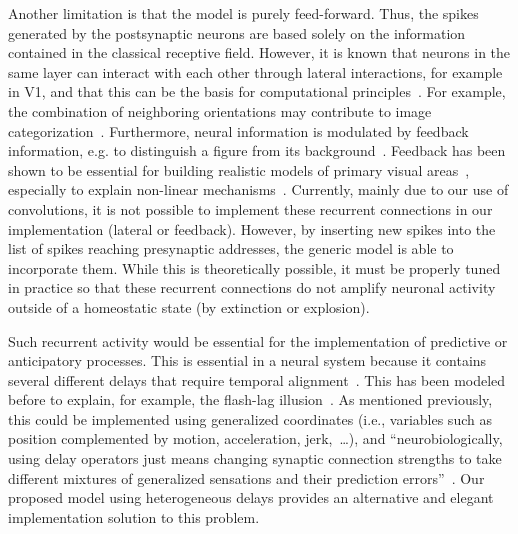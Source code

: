 \documentclass[default]{sn-jnl}%
\theoremstyle{thmstyleone}%
\theoremstyle{thmstyletwo}%
\theoremstyle{thmstylethree}%
\begin{document}
Another limitation is that the model is purely feed-forward. Thus, the spikes generated by the postsynaptic neurons are based solely on the information contained in the classical receptive field. However, it is known that neurons in the same layer can interact with each other through lateral interactions, for example in V1, and that this can be the basis for computational principles~\citep{chavane_revisiting_2022}. For example, the combination of neighboring orientations may contribute to image categorization~\citep{perrinet_edge_2015}. Furthermore, neural information is modulated by feedback information, e.g. to distinguish a figure from its background~\citep{roelfsema_early_2016}. Feedback has been shown to be essential for building realistic models of primary visual areas~\citep{boutin_sparse_2020, boutin_effect_2020}, especially to explain non-linear mechanisms~\citep{boutin_pooling_2022}. Currently, mainly due to our use of convolutions, it is not possible to implement these recurrent connections in our implementation (lateral or feedback). However, by inserting new spikes into the list of spikes reaching presynaptic addresses, the generic model is able to incorporate them. While this is theoretically possible, it must be properly tuned in practice so that these recurrent connections do not amplify neuronal activity outside of a homeostatic state (by extinction or explosion).

Such recurrent activity would be essential for the implementation of predictive or anticipatory processes. This is essential in a neural system because it contains several different delays that require temporal alignment~\citep{hogendoorn_predictive_2019}. This has been modeled before to explain, for example, the flash-lag illusion~\citep{khoei_flash-lag_2017}. As mentioned previously, this could be implemented using generalized coordinates (i.e., variables such as position complemented by motion, acceleration, jerk,~\ldots), and ``neurobiologically, using delay operators just means changing synaptic connection strengths to take different mixtures of generalized sensations and their prediction errors''~\citep{perrinet_active_2014}. Our proposed model using heterogeneous delays provides an alternative and elegant implementation solution to this problem.
%
\end{document}
